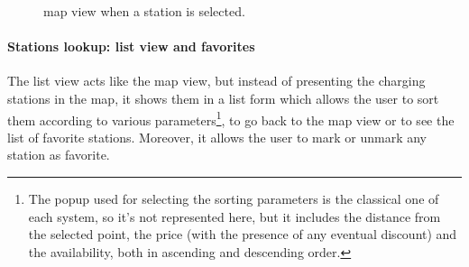 \begin{figure}[h!]
\begin{minipage}{0.49\textwidth}
        \caption{map view when a station is selected.}
    \end{minipage}
\end{figure}

\pagebreak

\paragraph{Stations lookup: list view and favorites} The list view acts like the map view, but instead of presenting the charging stations in the map, it shows them in a list form which allows the user to sort them according to various parameters\footnote{The popup used for selecting the sorting parameters is the classical one of each system, so it's not represented here, but it includes the distance from the selected point, the price (with the presence of any eventual discount) and the availability, both in ascending and descending order.}, to go back to the map view or to see the list of favorite stations. Moreover, it allows the user to mark or unmark any station as favorite.

